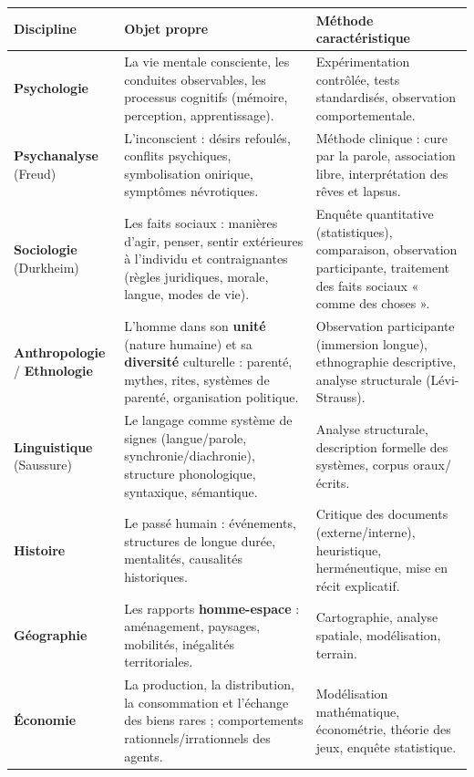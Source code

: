 \documentclass[11pt]{article}
\newcommand{\cle}[1]{{\popxbold\color{popdark}#1}}
\begin{document}
\begin{center}
\begin{tabularx}{\linewidth}{|l|X|X|}
\hline
\rowcolor{popblueL}
\textbf{Discipline} & \textbf{Objet propre} & \textbf{Méthode caractéristique} \\
\hline
\textbf{Psychologie} & La vie mentale consciente, les conduites observables, les processus cognitifs (mémoire, perception, apprentissage). & Expérimentation contrôlée, tests standardisés, observation comportementale. \\
\hline
\textbf{Psychanalyse} (Freud) & L'\cle{inconscient} : désirs refoulés, conflits psychiques, symbolisation onirique, symptômes névrotiques. & \cle{Méthode clinique} : cure par la parole, association libre, interprétation des rêves et lapsus. \\
\hline
\textbf{Sociologie} (Durkheim) & Les \cle{faits sociaux} : manières d'agir, penser, sentir extérieures à l'individu et contraignantes (règles juridiques, morale, langue, modes de vie). & Enquête quantitative (statistiques), comparaison, observation participante, traitement des faits sociaux « comme des choses ». \\
\hline
\textbf{Anthropologie} / \textbf{Ethnologie} & L'homme dans son \textbf{unité} (nature humaine) et sa \textbf{diversité} culturelle : parenté, mythes, rites, systèmes de parenté, organisation politique. & \cle{Observation participante} (immersion longue), ethnographie descriptive, analyse structurale (Lévi-Strauss). \\
\hline
\textbf{Linguistique} (Saussure) & Le \cle{langage} comme système de signes (langue/parole, synchronie/diachronie), structure phonologique, syntaxique, sémantique. & Analyse structurale, description formelle des systèmes, corpus oraux/écrits. \\
\hline
\textbf{Histoire} & Le passé humain : événements, structures de longue durée, mentalités, causalités historiques. & \cle{Critique des documents} (externe/interne), heuristique, herméneutique, mise en récit explicatif. \\
\hline
\textbf{Géographie} & Les rapports \textbf{homme-espace} : aménagement, paysages, mobilités, inégalités territoriales. & Cartographie, analyse spatiale, modélisation, terrain. \\
\hline
\textbf{Économie} & La production, la distribution, la consommation et l'échange des biens rares ; comportements rationnels/irrationnels des agents. & \cle{Modélisation} mathématique, économétrie, théorie des jeux, enquête statistique. \\
\hline
\end{tabularx}
\end{center}
\end{document}
